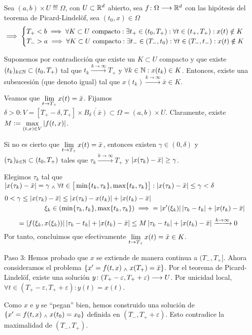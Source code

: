 \begin{teo}
	Sea $(a, b) \times U \eqdef \Omega$, con $U \subset \mathbb{R}^d$ abierto, sea $f \colon \Omega \longrightarrow \mathbb{R}^d$ con las hipótesis del teorema de Picard-Lindelöf, sea $(t_0, x) \in \Omega$
	\[\implies \begin{cases}
			T_+< b \implies \forall K \subset U \text{ compacto} : \exists t_+ \in (t_0, T_+) : \forall t \in (t_+, T_+) : x(t) \notin K \\
			T_->a \implies \forall K \subset U \text{ compacto} : \exists t_- \in (T_-, t_0) : \forall t \in (T_-, t_-) : x(t) \notin K  \\
		\end{cases}\]
	\begin{dem}
		Suponemos por contradicción que existe un $K \subset U$ compacto y que existe $(t_k)_{k\in \mathbb{N}} \subset (t_0, T_+)$ tal que $t_k\xrightarrow{k\to\infty} T_+$ y $\forall k \in \mathbb{N} : x(t_k) \in K$.
		Entonces, existe una subsucesión (que denoto igual) tal que $x(t_k) \xrightarrow{k\to\infty} \bar{x} \in K$.

		Veamos que $\displaystyle \lim_{t\to T_+} x(t) = \bar{x}$. Fijamos $\delta > 0 : V = [T_+-\delta, T_+] \times \overline{B_{\delta}(\bar{x})} \subset \Omega = (a, b) \times U$. Claramente, existe $\displaystyle M\vcentcolon=\max_{(t, x) \in V} \left|f(t, x)\right|$.

		Si no es cierto que $\displaystyle \lim_{t\to T_+} x(t) = \bar{x}$, entonces existen $\gamma \in (0, \delta)$ y $(\tau_k)_{k\in\mathbb{N}}\subset (t_0, T_+)$ tales que $\tau_k \xrightarrow{k\to\infty} T_+$ y $\left|x(\tau_k) - \bar{x}\right| \geq \gamma$.

		Elegimos $\tau_k$ tal que $\left|x(\tau_k) - \bar{x}\right| = \gamma \; _{\wedge} \; \forall t \in \big[\min\{t_k, \tau_k\}, \max\{t_k, \tau_k\}\big] : \left|x(\tau_k) - \bar{x}\right| \leq \gamma < \delta$
		\[\begin{aligned}
				0 < \gamma \leq \left|x(\tau_k) - \bar{x}\right| \leq \left|x(\tau_k) - x(t_k)\right| + \left|x(t_k) - \bar{x}\right|                             \\
				\xi_k \in (\min\{\tau_k, t_k\}, \max\{t_k, \tau_k\}) \implies & = \left|x'(\xi_k)\right|\left|\tau_k - t_k\right| + \left|x(t_k) - \bar{x}\right|
			\end{aligned}\]
		\[= \left|f(\xi_k, x(\xi_k))\right|\left|\tau_k - t_k\right| + \left|x(t_k) - \bar{x}\right| \leq M\left|\tau_k - t_k\right| + \left|x(t_k) - \bar{x}\right| \xrightarrow{k\to\infty} 0\]
		Por tanto, concluimos que efectivamente $\displaystyle \lim_{t\to T_+} x(t) = \bar{x} \in K$.

		Paso 3: Hemos probado que $x$ se extiende de manera continua a $(T_-, T_+]$. Ahora consideramos el problema $\{x'=f(t, x) \; _{\wedge} \; x(T_+) = \bar{x}\}$. Por el teorema de Picard-Lindelöf, existe una solución $y \colon (T_+ - \varepsilon, T_+ + \varepsilon) \longrightarrow U$. Por unicidad local, $\forall t \in (T_+-\varepsilon, T_+ + \varepsilon) : y(t) = x(t)$.

		Como $x$ e $y$ se ``pegan'' bien, hemos construido una solución de $\{x'=f(t, x) \; _{\wedge} \; x(t_0) = x_0\}$ definida en $(T_-, T_+ + \varepsilon)$. Esto contradice la maximalidad de $(T_-, T_+)$.
	\end{dem}
\end{teo}

